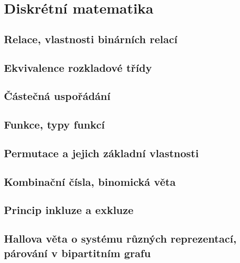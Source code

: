 \documentclass[../../main.tex]{subfiles}
\begin{document}
\section{Diskrétní matematika}

\subsection{Relace, vlastnosti binárních relací}
\subsection{Ekvivalence rozkladové třídy}
\subsection{Částečná uspořádání}
\subsection{Funkce, typy funkcí}
\subsection{Permutace a jejich základní vlastnosti}
\subsection{Kombinační čísla, binomická věta}
\subsection{Princip inkluze a exkluze}
\subsection{Hallova věta o systému různých reprezentací, párování v bipartitním grafu}
\end{document}
